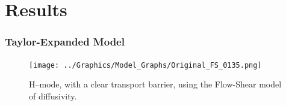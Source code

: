 \documentclass[10pt]{beamer}
\begin{document}

\section{Results}
\begin{frame} %
\frametitle{Taylor-Expanded Model}

\begin{figure}[h]
\begin{minipage}{0.65\linewidth}
	\centering
	\texttt{[image: ../Graphics/Model\_Graphs/Original\_FS\_0135.png]}
\end{minipage}
\begin{minipage}{0.34\linewidth}
	\caption{H--mode, with a clear transport barrier, using the Flow-Shear model of diffusivity.}
\end{minipage}
\end{figure}
\end{frame}
\end{document}
